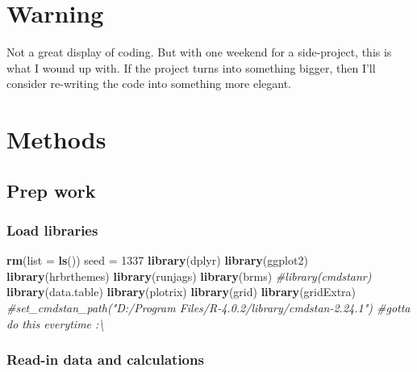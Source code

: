 \documentclass[
]{book}
\newenvironment{Shaded}{\begin{snugshade}}{\end{snugshade}}
\newcommand{\AttributeTok}[1]{\textcolor[rgb]{0.13,0.29,0.53}{#1}}
\newcommand{\CommentTok}[1]{\textcolor[rgb]{0.56,0.35,0.01}{\textit{#1}}}
\newcommand{\DecValTok}[1]{\textcolor[rgb]{0.00,0.00,0.81}{#1}}
\newcommand{\FunctionTok}[1]{\textcolor[rgb]{0.13,0.29,0.53}{\textbf{#1}}}
\newcommand{\NormalTok}[1]{#1}
\newcommand{\OtherTok}[1]{\textcolor[rgb]{0.56,0.35,0.01}{#1}}
\begin{document}
\hypertarget{warning}{%
\section{Warning}\label{warning}}

Not a great display of coding. But with one weekend for a side-project, this is what I wound up with. If the project turns into something bigger, then I'll consider re-writing the code into something more elegant.

\hypertarget{methods}{%
\section{Methods}\label{methods}}

\hypertarget{prep-work-4}{%
\subsection{Prep work}\label{prep-work-4}}

\hypertarget{load-libraries}{%
\subsubsection{Load libraries}\label{load-libraries}}

\begin{Shaded}
\begin{Highlighting}[]
\FunctionTok{rm}\NormalTok{(}\AttributeTok{list =} \FunctionTok{ls}\NormalTok{())}
\NormalTok{seed }\OtherTok{=} \DecValTok{1337}
\FunctionTok{library}\NormalTok{(dplyr)}
\FunctionTok{library}\NormalTok{(ggplot2)}
\FunctionTok{library}\NormalTok{(hrbrthemes)}
\FunctionTok{library}\NormalTok{(runjags)}
\FunctionTok{library}\NormalTok{(brms)}
\CommentTok{\#library(cmdstanr)}
\FunctionTok{library}\NormalTok{(data.table)}
\FunctionTok{library}\NormalTok{(plotrix)}
\FunctionTok{library}\NormalTok{(grid)}
\FunctionTok{library}\NormalTok{(gridExtra)}
\CommentTok{\#set\_cmdstan\_path("D:/Program Files/R{-}4.0.2/library/cmdstan{-}2.24.1") \#gotta do this everytime :\textbackslash{}}
\end{Highlighting}
\end{Shaded}

\hypertarget{read-in-data-and-calculations}{%
\subsubsection{Read-in data and calculations}\label{read-in-data-and-calculations}}
\end{document}
